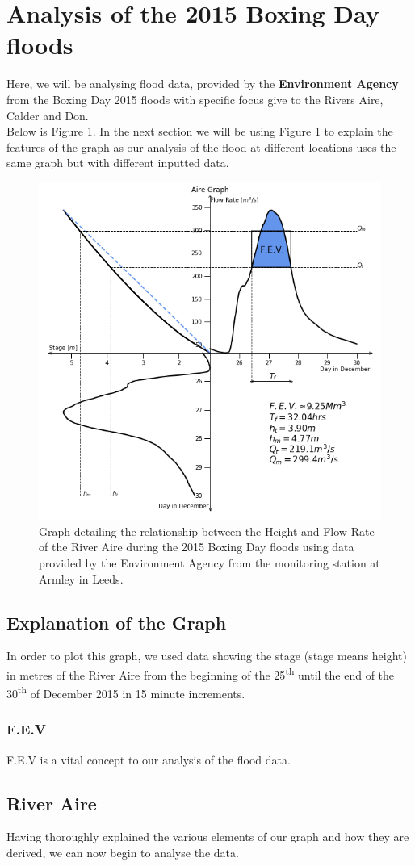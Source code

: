 \documentclass[11 pt, a4paper]{article}
\begin{document}
\newpage
\section{Analysis of the 2015 Boxing Day floods}
Here, we will be analysing flood data, provided by the {\bf Environment Agency} from the Boxing Day 2015 floods with specific focus give to the Rivers Aire, Calder and Don.\\
Below is Figure 1. In the next section we will be using Figure 1 to explain the features of the graph as our analysis of the flood at different locations uses the same graph but with different inputted data.
\begin{figure}[H]
\begin{center}
\includegraphics[width=.5\linewidth]{Aire-Quadrant_Graph.png}
\caption{Graph detailing the relationship between the Height and Flow Rate of the River Aire during the 2015 Boxing Day floods using data provided by the Environment Agency from the monitoring station at Armley in Leeds.}
\end{center}
\end{figure}
\subsection{Explanation of the Graph}
In order to plot this graph, we used data showing the stage (stage means height) in metres of the River Aire from the beginning of the 25\textsuperscript{th} until the end of the 30\textsuperscript{th} of December 2015 in 15 minute increments.
\subsubsection{F.E.V}
F.E.V is a vital concept to our analysis of the flood data.
\subsection{River Aire}
Having thoroughly explained the various elements of our graph and how they are derived, we can now begin to analyse the data.
\end{document}
